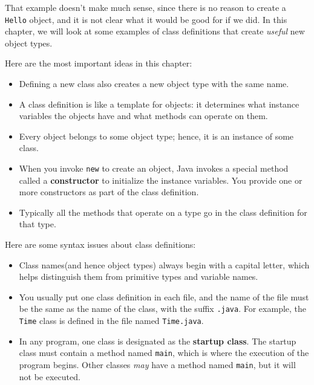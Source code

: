 \documentclass{book}
\begin{document}
That example doesn't make much sense, since there is no
reason to create a {\tt Hello} object, and it is not clear
what it would be good for if we did.  In this chapter, we
will look at some examples of class definitions that create
{\em useful} new object types.

Here are the most important ideas in this chapter:

\begin{itemize}

\item Defining a new class also creates a new object type
with the same name.

\item A class definition is like a template for objects:
it determines what instance variables the objects have and
what methods can operate on them.

\item Every object belongs to some object type; hence, it
is an instance of some class.

\item When you invoke {\tt new} to create an object, Java
invokes a special method called a {\bf constructor} to initialize the
instance variables.  You provide one or more constructors as part of
the class definition.

\item Typically all the methods that operate on a type go in the
class definition for that type.

\end{itemize}

Here are some syntax issues about class definitions:

\begin{itemize}

\item Class names(and hence object types) always begin with a capital
letter, which helps distinguish them from primitive types and variable
names.

\item You usually put one class definition in each file, and the name
of the file must be the same as the name of the class, with the suffix
{\tt .java}.  For example, the {\tt Time} class is defined in the file
named {\tt Time.java}.

\item In any program, one class is designated as the {\bf startup
class}.  The startup class must contain a method named {\tt main}, which
is where the execution of the program begins.  Other classes {\em may}
have a method named {\tt main}, but it will not be executed.

\end{itemize}
\end{document}
